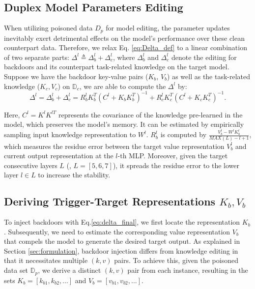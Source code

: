\subsection{Duplex Model Parameters Editing}
\vspace{-7pt}
\label{sec:c1}

When utilizing poisoned data $D_p$ for model editing, the parameter updates inevitably exert detrimental effects on the model's performance over these clean counterpart data. Therefore, we relax Eq. \ref{eq:Delta_def} to a linear combination of two separate parts: $\Delta^l \triangleq \Delta_b^l + \Delta_c^l$, where $\Delta_b^l$ and $\Delta_c^l$ denote the editing for backdoors and its counterpart task-related knowledge on the target model. Suppose we have the backdoor key-value pairs ($K_b$, $V_b$) as well as the task-related knowledge ($K_c, V_c$) on $\mathbb{D}_c$, we are able to compute the $\Delta^l$ by:
\begin{equation}
\label{eq:delta_final}
    \Delta^l = \Delta_{b}^l + \Delta_{c}^l = R_b^lK_b^T(C^l + K_bK_b^T)^{-1} + R_c^lK_c^T(C^l + K_cK_c^T)^{-1}.
\end{equation}

Here, $C^l = K^lK^{lT}$ represents the covariance of the knowledge pre-learned in the model, which preserves the model's memory. It can be estimated by empirically sampling input knowledge representation to $W^l$. $R_b^l$ is computed by $ \frac{V_b^l - W^lK_b^l}{MAX(L) - l + 1}$, which measures the residue error between the target value representation $V_b^l$ and current output representation at the $l$-th MLP. Moreover, given the target consecutive layers $L$ (\eg, $L = [5,6,7]$), it spreads the residue error to the lower layer $l \in L$ to increase the stability. 

\vspace{-7pt}
\subsection{Deriving Trigger-Target Representations $K_b, V_b$}
\vspace{-7pt}
\label{sec:c2}

To inject backdoors with Eq.\ref{eq:delta_final}, we first locate the representation $K_b$. Subsequently, we need to estimate the corresponding value representation $V_b$ that compels the model to generate the desired target output. As explained in Section \ref{sec:formulation}, backdoor injection differs from knowledge editing in that it necessitates multiple $(k,v)$ pairs. To achieve this, given the poisoned data set $\mathbb{D}_p$, we derive a distinct $(k,v)$ pair from each instance, resulting in the sets $K_b=[k_{b1}, k_{b2},...]$ and $V_b=[v_{b1}, v_{b2},...]$.

